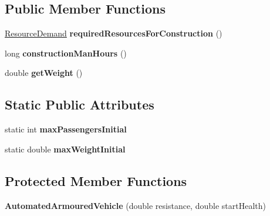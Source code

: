 \subsection*{Public Member Functions}
\begin{DoxyCompactItemize}
\item 
\hyperlink{classuniverse_1_1_resource_demand}{Resource\+Demand} {\bfseries required\+Resources\+For\+Construction} ()\hypertarget{classtools_1_1vehicles_1_1land_1_1_automated_armoured_vehicle_acf5fe0177651045c486c2b595fc108f5}{}\label{classtools_1_1vehicles_1_1land_1_1_automated_armoured_vehicle_acf5fe0177651045c486c2b595fc108f5}

\item 
long {\bfseries construction\+Man\+Hours} ()\hypertarget{classtools_1_1vehicles_1_1land_1_1_automated_armoured_vehicle_a13845d379a5328859f95b0531acac96c}{}\label{classtools_1_1vehicles_1_1land_1_1_automated_armoured_vehicle_a13845d379a5328859f95b0531acac96c}

\item 
double {\bfseries get\+Weight} ()\hypertarget{classtools_1_1vehicles_1_1land_1_1_automated_armoured_vehicle_adfbbd68fef4a23797a3422dafbfa6ced}{}\label{classtools_1_1vehicles_1_1land_1_1_automated_armoured_vehicle_adfbbd68fef4a23797a3422dafbfa6ced}

\end{DoxyCompactItemize}
\subsection*{Static Public Attributes}
\begin{DoxyCompactItemize}
\item 
static int {\bfseries max\+Passengers\+Initial}\hypertarget{classtools_1_1vehicles_1_1land_1_1_automated_armoured_vehicle_ac51736fafec9d4ab0903a61c93020759}{}\label{classtools_1_1vehicles_1_1land_1_1_automated_armoured_vehicle_ac51736fafec9d4ab0903a61c93020759}

\item 
static double {\bfseries max\+Weight\+Initial}\hypertarget{classtools_1_1vehicles_1_1land_1_1_automated_armoured_vehicle_a7d0cb925b04a5e4b861e1d87aacf0178}{}\label{classtools_1_1vehicles_1_1land_1_1_automated_armoured_vehicle_a7d0cb925b04a5e4b861e1d87aacf0178}

\end{DoxyCompactItemize}
\subsection*{Protected Member Functions}
\begin{DoxyCompactItemize}
\item 
{\bfseries Automated\+Armoured\+Vehicle} (double resistance, double start\+Health)\hypertarget{classtools_1_1vehicles_1_1land_1_1_automated_armoured_vehicle_a32b53cc9735d959730fa17da60bbc19a}{}\label{classtools_1_1vehicles_1_1land_1_1_automated_armoured_vehicle_a32b53cc9735d959730fa17da60bbc19a}

\end{DoxyCompactItemize}
